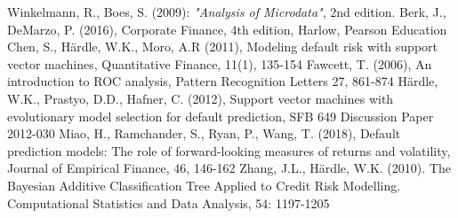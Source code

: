 \documentclass{article}
\begin{document}
\begin{thebibliography}{9}
  Winkelmann, R., Boes, S. (2009): \textit{"Analysis of Microdata"}, 2nd edition.
  Berk, J., DeMarzo, P. (2016), Corporate Finance, 4th edition, Harlow, Pearson Education 
  Chen, S., H{\"a}rdle, W.K., Moro, A.R (2011), Modeling default risk with support vector machines,  Quantitative Finance, 11(1), 135-154
  Fawcett, T. (2006), An introduction to ROC analysis, Pattern Recognition Letters 27, 861-874
  H{\"a}rdle, W.K., Prastyo, D.D., Hafner, C. (2012), Support vector machines with evolutionary model selection for default prediction, SFB 649 Discussion Paper 2012-030
  Miao, H., Ramchander, S., Ryan, P., Wang, T. (2018), Default prediction models: The role of forward-looking measures of returns and volatility, Journal of Empirical Finance, 46, 146-162
  Zhang, J.L., H{\"a}rdle, W.K. (2010). The Bayesian Additive Classification Tree Applied to Credit Risk Modelling. Computational Statistics and Data Analysis, 54: 1197-1205 
\end{thebibliography}
\end{document}
